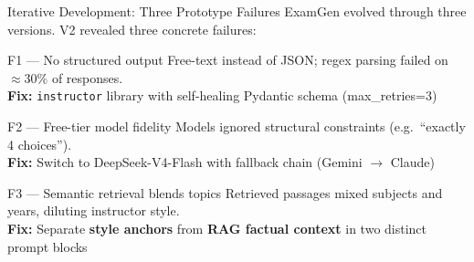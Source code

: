\documentclass[aspectratio=169]{beamer}
\begin{document}
\begin{frame}{Iterative Development: Three Prototype Failures}
  ExamGen evolved through three versions. V2 revealed three concrete failures:

  \vspace{6pt}
  \begin{block}{F1 — No structured output}
    Free-text instead of JSON; regex parsing failed on $\approx$30\% of responses.\\
    \textbf{Fix:} \texttt{instructor} library with self-healing Pydantic schema (max\_retries=3)
  \end{block}

  \begin{block}{F2 — Free-tier model fidelity}
    Models ignored structural constraints (e.g.\ ``exactly 4 choices'').\\
    \textbf{Fix:} Switch to DeepSeek-V4-Flash with fallback chain (Gemini $\to$ Claude)
  \end{block}

  \begin{block}{F3 — Semantic retrieval blends topics}
    Retrieved passages mixed subjects and years, diluting instructor style.\\
    \textbf{Fix:} Separate \textbf{style anchors} from \textbf{RAG factual context}
    in two distinct prompt blocks
  \end{block}
\end{frame}
\end{document}
